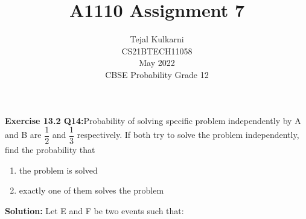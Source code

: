 \documentclass[journal,12pt,two column]{IEEEtran}
\title{A1110 Assignment 7 }
\author{Tejal Kulkarni \\ CS21BTECH11058 \\\vspace*{20pt} May 2022 \\ CBSE Probability Grade 12 }
\begin{document}
\newcommand{\solution}{\noindent \textbf{Solution: }}
\providecommand{\pr}[1]{\ensuremath{\Pr\left(#1\right)}}
\providecommand{\qfunc}[1]{\ensuremath{Q\left(#1\right)}}
\providecommand{\sbrak}[1]{\ensuremath{{}\left[#1\right]}}
\providecommand{\lsbrak}[1]{\ensuremath{{}\left[#1\right.}}
\providecommand{\rsbrak}[1]{\ensuremath{{}\left.#1\right]}}
\providecommand{\brak}[1]{\ensuremath{\left(#1\right)}}
\providecommand{\lbrak}[1]{\ensuremath{\left(#1\right.}}
\providecommand{\rbrak}[1]{\ensuremath{\left.#1\right)}}
\providecommand{\cbrak}[1]{\ensuremath{\left\{#1\right\}}}
\providecommand{\lcbrak}[1]{\ensuremath{\left\{#1\right.}}
\providecommand{\rcbrak}[1]{\ensuremath{\left.#1\right\}}}
\newcommand*{\permcomb}[4][0mu]{{{}^{#3}\mkern#1#2_{#4}}}
\newcommand*{\perm}[1][-3mu]{\permcomb[#1]{P}}
\newcommand*{\comb}[1][-1mu]{\permcomb[#1]{C}}
\renewcommand{\thetable}{\arabic{table}} 

\maketitle

\textbf{Exercise 13.2 Q14:}Probability of solving specific problem independently by A and B are $\dfrac{1}{2}$ and $\dfrac{1}{3}$ respectively. If both try to solve the problem independently, find the probability that 
\begin{enumerate}[label = (\roman*)]
    \item the problem is solved
    \item exactly one of them solves the problem
\end{enumerate}
\solution Let  E and F be two events such that:
\begin{table}[ht!]
    \centering
    
    \caption{}
    \label{Table 1}
\end{table}
\end{document}
